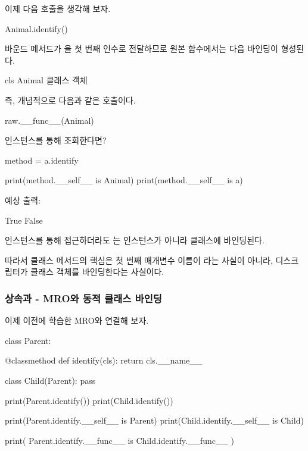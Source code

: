 이제 다음 호출을 생각해 보자.

\begin{dhkcode}
Animal.identify()
\end{dhkcode}

바운드 메서드가 을 첫 번째 인수로 전달하므로 원본 함수에서는 다음 바인딩이 형성된다.

\begin{dhksmry}[centered]
cls \ra Animal 클래스 객체
\end{dhksmry}

즉, 개념적으로 다음과 같은 호출이다.

\begin{dhkcode}
raw.__func__(Animal)
\end{dhkcode}

\begin{dhknote}
\begin{dhksmry}[centered]
인스턴스를 통해 조회한다면?
\end{dhksmry}
\end{dhknote}

\begin{dhkcode}
method = a.identify

print(method.__self__ is Animal)
print(method.__self__ is a)
\end{dhkcode}

예상 출력:

\begin{dhkzsh}
True
False
\end{dhkzsh}

인스턴스를 통해 접근하더라도 는 인스턴스가 아니라 클래스에 바인딩된다.

따라서 클래스 메서드의 핵심은 첫 번째 매개변수 이름이 라는 사실이 아니라, 디스크립터가 클래스 객체를 바인딩한다는 사실이다.

\subsubsection{상속과  - MRO와 동적 클래스 바인딩}

이제 이전에 학습한 MRO와 연결해 보자.

\begin{dhkcode}
class Parent:

    @classmethod
    def identify(cls):
        return cls.__name__


class Child(Parent):
    pass


print(Parent.identify())
print(Child.identify())

print(Parent.identify.__self__ is Parent)
print(Child.identify.__self__ is Child)

print(
    Parent.identify.__func__
    is Child.identify.__func__
)
\end{dhkcode}

